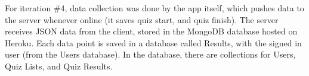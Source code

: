 For iteration \#4, data collection was done by the app itself, which pushes data to the server whenever online (it saves quiz start, and quiz finish). The server receives JSON data from the client, stored in the MongoDB database hosted on Heroku. Each data point is saved in a database called Results, with the signed in user (from the Users database). In the database, there are collections for Users, Quiz Lists, and Quiz Results.
